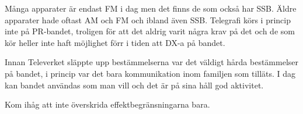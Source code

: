 Många apparater är endast FM i dag men det finns de som också har SSB. Äldre apparater hade oftast AM och FM och ibland även SSB. Telegrafi körs i princip inte på PR-bandet, troligen för att det aldrig varit några krav på det och de som kör heller inte haft möjlighet förr i tiden att DX-a på bandet. 

Innan Televerket släppte upp bestämmelserna var det väldigt hårda bestämmelser på bandet, i princip var det bara kommunikation inom familjen som tilläts. I dag kan bandet användas som man vill och det är på sina håll god aktivitet. 

Kom ihåg att inte överskrida effektbegränsningarna bara.